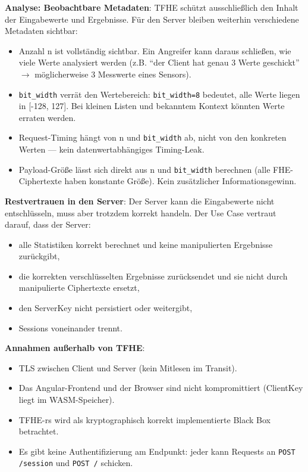 \textbf{Analyse: Beobachtbare Metadaten}:
TFHE schützt ausschließlich den Inhalt der Eingabewerte und Ergebnisse. Für den Server bleiben weiterhin verschiedene Metadaten sichtbar:
\begin{itemize}
    \item Anzahl n ist vollständig sichtbar. Ein Angreifer kann daraus schließen, wie viele Werte analysiert werden (z.B. \enquote{der Client hat genau 3 Werte geschickt} $\rightarrow$ möglicherweise 3 Messwerte eines Sensors).
    \item \verb|bit_width| verrät den Wertebereich: \verb|bit_width=8| bedeutet, alle Werte liegen in [-128, 127]. Bei kleinen Listen und bekanntem Kontext könnten Werte erraten werden.
    \item Request-Timing hängt von n und \verb|bit_width| ab, nicht von den konkreten Werten — kein datenwertabhängiges Timing-Leak.
    \item Payload-Größe lässt sich direkt aus n und \verb|bit_width| berechnen (alle FHE-Ciphertexte haben konstante Größe). Kein zusätzlicher Informationsgewinn.
\end{itemize}

\textbf{Restvertrauen in den Server}:
Der Server kann die Eingabewerte nicht entschlüsseln, muss aber trotzdem korrekt handeln. Der Use Case vertraut darauf, dass der Server:
\begin{itemize}
    \item alle Statistiken korrekt berechnet und keine manipulierten Ergebnisse zurückgibt,
    \item die korrekten verschlüsselten Ergebnisse zurücksendet und sie nicht durch manipulierte Ciphertexte ersetzt,
    \item den ServerKey nicht persistiert oder weitergibt,
    \item Sessions voneinander trennt.
\end{itemize}

\textbf{Annahmen außerhalb von TFHE}:
\begin{itemize}
    \item TLS zwischen Client und Server (kein Mitlesen im Transit).
    \item Das Angular-Frontend und der Browser sind nicht kompromittiert (ClientKey liegt im WASM-Speicher).
    \item TFHE-rs wird als kryptographisch korrekt implementierte Black Box betrachtet.
    \item Es gibt keine Authentifizierung am Endpunkt: jeder kann Requests an \verb|POST /session| und \verb|POST /| schicken.
\end{itemize}

